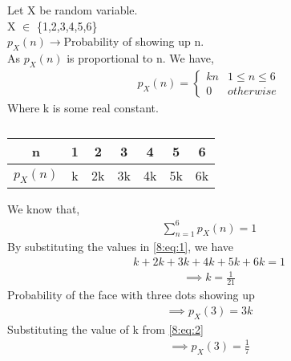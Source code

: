 Let X be random variable.\\
X $\in$ \{1,2,3,4,5,6\}\\
$p_{X}(n)\rightarrow$Probability of showing up n.\\
As $p_{X}(n)$ is proportional to n. We have,
\begin{align}
    p_{X}(n) = 
    \begin{cases}
        kn & 1 \leq n \leq 6 \\
        0  & otherwise
    \end{cases}
    \tag{8.1}
\end{align}
Where k is some real constant.

\begin{table}[ht]
\centering 
\caption{}
\begin{tabular}{|c|c|c|c|c|c|c|}
\hline
 n          & 1 & 2 & 3 & 4 & 5 & 6 \\
\hline
 $p_{X}(n)$ & k  & 2k & 3k & 4k & 5k & 6k\\
\hline
\end{tabular}
\label{8:table}
\end{table}

We know that,
\begin{align}
    \tag{8.2}
    \sum_{n=1}^6 p_{X}(n)=1
    \label{8:eq:1}
\end{align}
By substituting the values in \ref{8:eq:1}, we have
\begin{align}
    \tag{8.3}
    k+2k+3k+4k+5k+6k=1
\end{align}
\begin{align}
     \tag{8.4}
   \implies  k=\frac{1}{21}
   \label{8:eq:2}
\end{align}
Probability of the face with three dots showing up 
\begin{align}
    \tag{8.5}
    \implies p_{X}(3)=3k
\end{align}
Substituting the value of k from \ref{8:eq:2}
\begin{align}
    \tag{8.6}
    \implies p_{X}(3)=\frac{1}{7}
\end{align}
